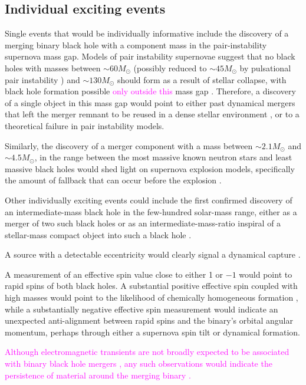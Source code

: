 \documentclass[iop,onecolumn]{revtex4}
\newcommand{\ilya}[1]{\textcolor{magenta}{#1}}
\begin{document}
\subsection{Individual exciting events}
Single events that would be individually informative include the discovery of a merging binary black hole with a component mass in the pair-instability supernova mass gap.  Models of pair instability supernovae suggest that no black holes with masses between $\sim 60 M_\odot$ (possibly reduced to $\sim 45 M_\odot$ by pulsational pair instability \citep{Woosley:2017}) and $\sim 130 M_\odot$ should form as a result of stellar collapse, with black hole formation possible \ilya{only outside this} mass gap \citep{Marchant:2016}.  Therefore, a discovery of a single object in this mass gap would point to either past dynamical mergers that left the merger remnant to be reused in a dense stellar environment \citep{Rodriguez:2018}, or to a theoretical failure in pair instability models. 

Similarly, the discovery of a merger component with a mass between $\sim 2.1 M_\odot$ and $\sim 4.5 M_\odot$, in the range between the most massive known neutron stars and least massive black holes \citep{Ozel:2010,Farr:2011} would shed light on supernova explosion models, specifically the amount of fallback that can occur before the explosion \citep{Fryer:2012}.

Other individually exciting events could include the first confirmed discovery of an intermediate-mass black hole in the few-hundred solar-mass range, either as a merger of two such black holes \citep[e.g.,][]{AmaroSeoaneSantamaria:2009,Veitch:2015,Graff:2015} or as an intermediate-mass-ratio inspiral of a stellar-mass compact object into such a black hole \citep[e.g.,][]{Mandel:2008,Haster:2015IMRI,Haster:2016}. 

A source with a detectable eccentricity would clearly signal a dynamical capture \citep{Breivik:2016}. 

A measurement of an effective spin value close to either 1 or $-1$ would point to rapid spins of both black holes. A substantial positive effective spin coupled with high masses would point to the likelihood of chemically homogeneous formation \citep{Marchant:2016}, while a substantially negative effective spin measurement would indicate an unexpected anti-alignment between rapid spins and the binary's orbital angular momentum, perhaps through either a supernova spin tilt or dynamical formation.  

\ilya{Although electromagnetic transients are not broadly expected to be associated with binary black hole mergers \citep[e.g.,][]{Lyutikov:2016}, any such observations would indicate the persistence of material around the merging binary \citep[e.g.,][]{deMinkKing:2017}.}
\end{document}
